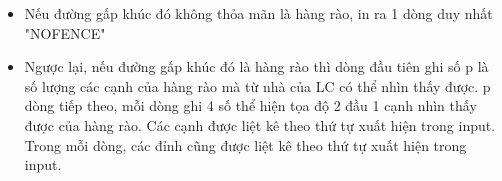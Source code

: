 \begin{itemize}
	\item     Nếu đường gấp khúc đó không thỏa mãn là hàng rào, in ra 1 dòng duy nhất "NOFENCE"   
	\item     Ngược lại, nếu đường gấp khúc đó là hàng rào thì dòng đầu tiên ghi số p là số lượng các cạnh của hàng rào mà từ nhà của LC có thể nhìn thấy được. p dòng tiếp theo, mỗi dòng ghi 4 số thể hiện tọa độ 2 đầu 1 cạnh nhìn thấy được của hàng rào. Các cạnh được liệt kê theo thứ tự xuất hiện trong input. Trong mỗi dòng, các đỉnh cũng được liệt kê theo thứ tự xuất hiện trong input.   
\end{itemize}